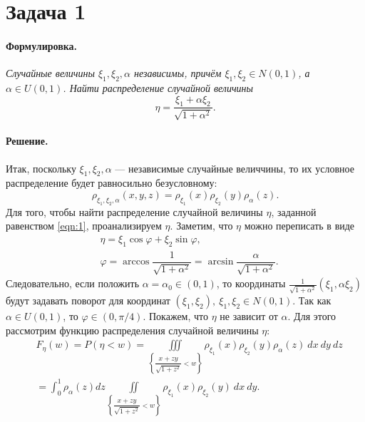 \documentclass[specialist,
substylefile = spbu_report.rtx,
subf,href,colorlinks=true, 12pt]{disser}
\newenvironment{formulation}{\paragraph{Формулировка.}\itshape}{\hfill}
\newenvironment{solution}{\paragraph{Решение.}}{\hfill}
\begin{document}
	\section{Задача 1}
	\begin{formulation}
		Случайные величины $\xi_1,\xi_2,\alpha$ независимы, причём $\xi_1,\xi_2\in N(0,1)$, а $\alpha\in U(0,1)$. Найти распределение случайной величины
		\begin{equation}\label{eqn:1}
			\eta = \dfrac{\xi_1 + \alpha\xi_2}{\sqrt{1+\alpha^2}}.
		\end{equation}
	\end{formulation}
	\begin{solution}
		Итак, поскольку $\xi_1, \xi_2, \alpha$ --- независимые случайные величчины, то их условное распределение будет равносильно безусловному:
		\begin{equation*}
			\rho_{\xi_1,\xi_2,\alpha}(x,y,z)=\rho_{\xi_1}(x)\rho_{\xi_2}(y)\rho_{\alpha}(z).
		\end{equation*}
		Для того, чтобы найти распределение случайной величины $\eta$, заданной равенством \eqref{eqn:1}, проанализируем $\eta$. Заметим, что $\eta$ можно переписать в виде
		\begin{align*}
			&\eta = \xi_1\cos\varphi + \xi_2\sin\varphi,\\
			&\varphi = \arccos\dfrac{1}{\sqrt{1+\alpha^2}}=\arcsin\dfrac{\alpha}{\sqrt{1+\alpha^2}}.
		\end{align*}
		Следовательно, если положить $\alpha=\alpha_0\in(0,1)$, то координаты $\frac{1}{\sqrt{1+\alpha^2}}(\xi_1, \alpha\xi_2)$ будут задавать поворот для координат $(\xi_1, \xi_2),~\xi_1,\xi_2\in N(0,1)$. Так как $\alpha\in U(0,1)$, то $\varphi\in(0, \pi/4)$. Покажем, что $\eta$ не зависит от $\alpha$. Для этого рассмотрим функцию распределения случайной величины $\eta$: 
		\begin{align*}
			&F_\eta(w) = P(\eta<w)=\iiint\limits_{\left \{\dfrac{x + zy}{\sqrt{1+z^2}}<w\right \} }\rho_{\xi_1}(x)\rho_{\xi_2}(y)\rho_{\alpha}(z)~dx~dy~dz\\
			&=\int_0^1\rho_\alpha(z)dz\iint\limits_{\left \{\dfrac{x + zy}{\sqrt{1+z^2}}<w\right \} }\rho_{\xi_1}(x)\rho_{\xi_2}(y)~dx~dy.
		\end{align*}

\end{solution}
\end{document}
